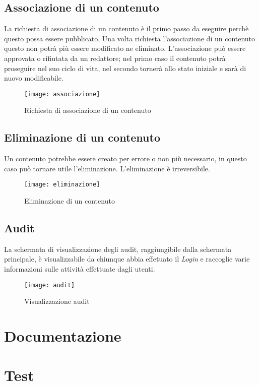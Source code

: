 \subsection{Associazione di un contenuto}
La richiesta di associazione di un contenuto è il primo passo da eseguire perchè questo possa essere pubblicato. Una volta richiesta l'associazione di un contenuto questo non potrà più essere modificato ne eliminato. L'associazione può essere approvata o rifiutata da un redattore; nel primo caso il contenuto potrà proseguire nel suo ciclo di vita, nel secondo tornerà allo stato iniziale e sarà di nuovo modificabile.
\begin{figure}[h]
    \begin{center}
    \texttt{[image: associazione]}
    \caption{Richiesta di associazione di un contenuto}
    \label{fig:figure28}
    \end{center}
\end{figure}

\subsection{Eliminazione di un contenuto}
Un contenuto potrebbe essere creato per errore o non più necessario, in questo caso può tornare utile l'eliminazione. L'eliminazione è irreversibile.
\begin{figure}[h]
    \begin{center}
    \texttt{[image: eliminazione]}
    \caption{Eliminazione di un contenuto}
    \label{fig:figure29}
    \end{center}
\end{figure}

\subsection{Audit}
La schermata di visualizzazione degli audit, raggiungibile dalla schermata principale, è visualizzabile da chiunque abbia effetuato il \textit{Login} e raccoglie varie informazioni sulle attività effettuate dagli utenti.
\begin{figure}[h]
    \begin{center}
    \texttt{[image: audit]}
    \caption{Visualizzazione audit}
    \label{fig:figure30}
    \end{center}
\end{figure}

\section{Documentazione}

\section{Test}
